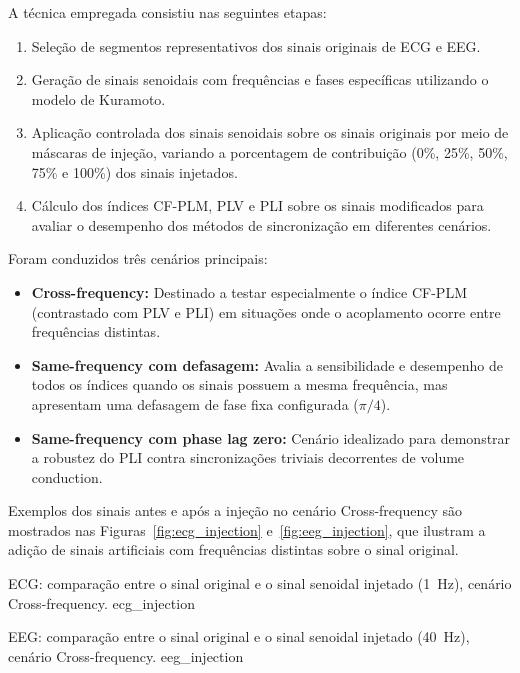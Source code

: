 A técnica empregada consistiu nas seguintes etapas:
\begin{enumerate}
    \item Seleção de segmentos representativos dos sinais originais de ECG e EEG.
    \item Geração de sinais senoidais com frequências e fases específicas utilizando o modelo de Kuramoto.
    \item Aplicação controlada dos sinais senoidais sobre os sinais originais por meio de máscaras de injeção, variando a porcentagem de contribuição (0\%, 25\%, 50\%, 75\% e 100\%) dos sinais injetados.
    \item Cálculo dos índices CF-PLM, PLV e PLI sobre os sinais modificados para avaliar o desempenho dos métodos de sincronização em diferentes cenários.
\end{enumerate}

Foram conduzidos três cenários principais:
\begin{itemize}
    \item \textbf{Cross-frequency:} Destinado a testar especialmente o índice CF-PLM (contrastado com PLV e PLI) em situações onde o acoplamento ocorre entre frequências distintas.
    \item \textbf{Same-frequency com defasagem:} Avalia a sensibilidade e desempenho de todos os índices quando os sinais possuem a mesma frequência, mas apresentam uma defasagem de fase fixa configurada (\(\pi/4\)).
    \item \textbf{Same-frequency com phase lag zero:} Cenário idealizado para demonstrar a robustez do PLI contra sincronizações triviais decorrentes de volume conduction.
\end{itemize}

Exemplos dos sinais antes e após a injeção no cenário Cross-frequency são mostrados nas Figuras~\ref{fig:ecg_injection} e~\ref{fig:eeg_injection}, que ilustram a adição de sinais artificiais com frequências distintas sobre o sinal original.

{ECG: comparação entre o sinal original e o sinal senoidal injetado (1~Hz), cenário Cross-frequency.}
{ecg_injection}

{EEG: comparação entre o sinal original e o sinal senoidal injetado (40~Hz), cenário Cross-frequency.}
{eeg_injection}


